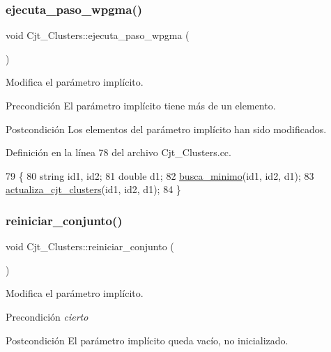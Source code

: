 \subsubsection{\texorpdfstring{ejecuta\+\_\+paso\+\_\+wpgma()}{ejecuta\_paso\_wpgma()}}
{\footnotesize\ttfamily void Cjt\+\_\+\+Clusters\+::ejecuta\+\_\+paso\+\_\+wpgma (\begin{DoxyParamCaption}{ }\end{DoxyParamCaption})}



Modifica el parámetro implícito. 

\begin{DoxyPrecond}{Precondición}
El parámetro implícito tiene más de un elemento. 
\end{DoxyPrecond}
\begin{DoxyPostcond}{Postcondición}
Los elementos del parámetro implícito han sido modificados. 
\end{DoxyPostcond}


Definición en la línea 78 del archivo Cjt\+\_\+\+Clusters.\+cc.


\begin{DoxyCode}
79 \{
80     \textcolor{keywordtype}{string} id1, id2;
81     \textcolor{keywordtype}{double} d1;
82     \hyperlink{class_cjt___clusters_afc180c4e851b321837f6d2c173916e57}{busca\_minimo}(id1, id2, d1);
83     \hyperlink{class_cjt___clusters_a423d4312a548689125a245f32f4a87b5}{actualiza\_cjt\_clusters}(id1, id2, d1);
84 \}
\end{DoxyCode}
\mbox{\label{class_cjt___clusters_a6ece0ade60c6bc9497f127b6ae0cfd23}} 
\subsubsection{\texorpdfstring{reiniciar\+\_\+conjunto()}{reiniciar\_conjunto()}}
{\footnotesize\ttfamily void Cjt\+\_\+\+Clusters\+::reiniciar\+\_\+conjunto (\begin{DoxyParamCaption}{ }\end{DoxyParamCaption})}



Modifica el parámetro implícito. 

\begin{DoxyPrecond}{Precondición}
{\itshape cierto} 
\end{DoxyPrecond}
\begin{DoxyPostcond}{Postcondición}
El parámetro implícito queda vacío, no inicializado. 
\end{DoxyPostcond}


